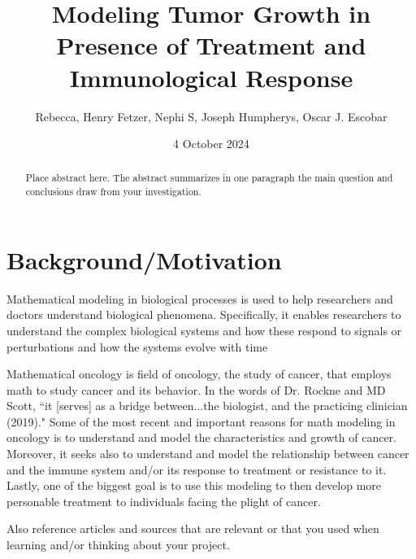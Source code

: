 \documentclass[11pt]{amsart}
\begin{document}
\title{Modeling Tumor Growth in Presence of Treatment and Immunological Response}
\author{Rebecca, Henry Fetzer, Nephi S, Joseph Humpherys, Oscar J. Escobar}

\date{4 October 2024} %

\maketitle %

\begin{abstract}
Place abstract here. The abstract summarizes in one paragraph the main question and conclusions draw from your investigation.
\end{abstract}

\section{Background/Motivation}

Mathematical modeling in biological processes is used to help researchers and doctors understand biological phenomena. 
Specifically, it enables researchers to understand the complex biological systems and how these respond to signals or perturbations and how the systems evolve with time \cite{IntroMathOnc}

Mathematical oncology is field of oncology, the study of cancer, that employs math to study cancer and its behavior.
In the words of Dr. Rockne and MD Scott, ``it [serves] as a bridge between...the biologist, and the practicing clinician (2019)."
Some of the most recent and important reasons for math modeling in oncology is to understand and model the characteristics and growth of cancer. Moreover, it seeks also to understand and model the relationship between cancer and the immune system and/or its response to treatment or resistance to it. Lastly, one of the biggest goal is to use this modeling to then develop more personable treatment to individuals facing the plight of cancer. 





Also reference articles and sources \cite{Vandermeersch} that are relevant or that you used when learning and/or thinking about your project.
\end{document}
